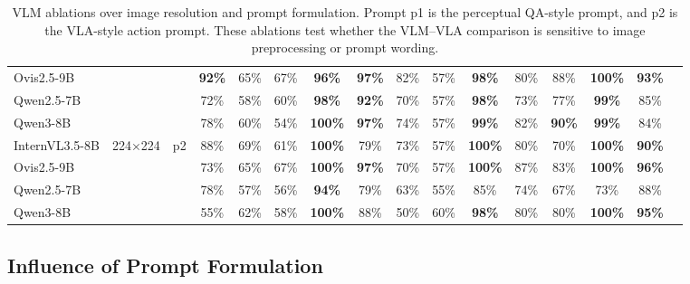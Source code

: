\documentclass{llmxive}
\providecommand{\heatDG}[1]{\cellcolor{mydarkgreen}\textbf{#1}}
\providecommand{\heatG}[1]{\cellcolor{mygreen}#1}
\providecommand{\heatLG}[1]{\cellcolor{mylightgreen}#1}
\providecommand{\heatO}[1]{\cellcolor{myorange}#1}
\begin{document}
\begin{table}[t]
{\begin{tabular}{lccccccccccccccc}
Ovis2.5-9B
& & 
& \heatDG{92\%} & \heatG{65\%} & \heatG{67\%} & \heatDG{96\%} & \heatDG{97\%} & \heatG{82\%} & \heatLG{57\%} & \heatDG{98\%} & \heatG{80\%} & \heatG{88\%} & \heatDG{100\%} & \heatDG{93\%} \\

Qwen2.5-7B
& & 
& \heatG{72\%} & \heatLG{58\%} & \heatG{60\%} & \heatDG{98\%} & \heatDG{92\%} & \heatG{70\%} & \heatLG{57\%} & \heatDG{98\%} & \heatG{73\%} & \heatG{77\%} & \heatDG{99\%} & \heatG{85\%} \\

Qwen3-8B
& & 
& \heatG{78\%} & \heatG{60\%} & \heatLG{54\%} & \heatDG{100\%} & \heatDG{97\%} & \heatG{74\%} & \heatLG{57\%} & \heatDG{99\%} & \heatG{82\%} & \heatDG{90\%} & \heatDG{99\%} & \heatG{84\%} \\

\midrule
InternVL3.5-8B
& \multirow{4}{*}{224$\times$224}
& \multirow{4}{*}{p2}
& \heatG{88\%} & \heatG{69\%} & \heatG{61\%} & \heatDG{100\%} & \heatG{79\%} & \heatG{73\%} & \heatLG{57\%} & \heatDG{100\%} & \heatG{80\%} & \heatG{70\%} & \heatDG{100\%} & \heatDG{90\%} \\

Ovis2.5-9B
& & 
& \heatG{73\%} & \heatG{65\%} & \heatG{67\%} & \heatDG{100\%} & \heatDG{97\%} & \heatG{70\%} & \heatLG{57\%} & \heatDG{100\%} & \heatG{87\%} & \heatG{83\%} & \heatDG{100\%} & \heatDG{96\%} \\

Qwen2.5-7B
& & 
& \heatG{78\%} & \heatLG{57\%} & \heatLG{56\%} & \heatDG{94\%} & \heatG{79\%} & \heatG{63\%} & \heatLG{55\%} & \heatG{85\%} & \heatG{74\%} & \heatG{67\%} & \heatG{73\%} & \heatG{88\%} \\

Qwen3-8B
& & 
& \heatLG{55\%} & \heatG{62\%} & \heatLG{58\%} & \heatDG{100\%} & \heatG{88\%} & \heatO{50\%} & \heatG{60\%} & \heatDG{98\%} & \heatG{80\%} & \heatG{80\%} & \heatDG{100\%} & \heatDG{95\%} \\
\bottomrule
\end{tabular}%
}
\caption{VLM ablations over image resolution and prompt formulation. Prompt p1 is the perceptual QA-style prompt, and p2 is the VLA-style action prompt. These ablations test whether the VLM--VLA comparison is sensitive to image preprocessing or prompt wording.}
\label{tab:appendix_vlm_resolution_prompt_ablation}
\end{table}




\subsection{Influence of Prompt Formulation}
\end{document}
